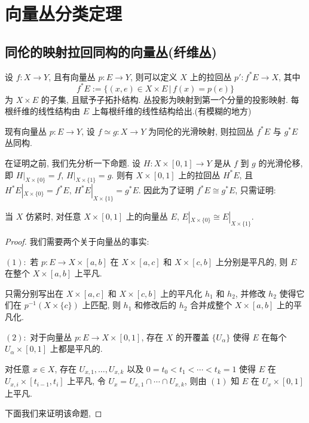     \section{向量丛分类定理}
    \subsection{同伦的映射拉回同构的向量丛(纤维丛)}
    \begin{definition}[拉回丛的定义]
        设 $f:X\rightarrow Y$, 且有向量丛 $p:E\rightarrow Y$, 则可以定义 $X$ 上的拉回丛 $p':f^*E\rightarrow X$, 其中 
        \begin{equation*}
            f^*E:=\{(x,e)\in X\times E\,\big|\,f(x)=p(e)\}
        \end{equation*}
        为 $X\times E$ 的子集, 且赋予子拓扑结构. 丛投影为映射到第一个分量的投影映射. 每根纤维的线性结构由 $E$ 上每根纤维的线性结构给出.(有模糊的地方)
    \end{definition}
    \begin{proposition}[同伦的映射拉回同构的向量丛]
        现有向量丛 $p:E\rightarrow Y$, 设 $f\simeq g:X\rightarrow Y$ 为同伦的光滑映射, 则拉回丛 $f^*E$ 与 $g^*E$ 丛同构.
    \end{proposition}

    在证明之前, 我们先分析一下命题. 设 $H:X\times[0,1]\rightarrow Y$ 是从 $f$ 到 $g$ 的光滑伦移, 即 $H|_{X\times\{0\}}=f$, $H|_{X\times\{1\}}=g$. 则有 $X\times[0,1]$ 上的拉回丛 $H^*E$, 
    且 $H^*E|_{X\times\{0\}}=f^*E,\,H^*E|_{X\times\{1\}}=g^*E$. 因此为了证明 $f^*E\cong g^*E$, 只需证明:

    \begin{proposition}[向量丛在柱空间的上下底的限制是同构的]
        当 $X$ 仿紧时, 对任意 $X\times[0,1]$ 上的向量丛 $E$, $E|_{X\times\{0\}}\cong E|_{X\times\{1\}}$.
    \end{proposition}
    \begin{proof}
        我们需要两个关于向量丛的事实:

        $(1):$ 若 $p:E\rightarrow X\times[a,b]$ 在 $X\times[a,c]$ 和 $X\times[c,b]$ 上分别是平凡的, 则 $E$ 在整个 $X\times[a,b]$ 上平凡. 
        
        只需分别写出在 $X\times[a,c]$ 和 $X\times[c,b]$ 
        上的平凡化 $h_1$ 和 $h_2$, 并修改 $h_2$ 使得它们在 $p^{-1}(X\times\{c\})$ 上匹配, 则 $h_1$ 和修改后的 $h_2$ 合并成整个 $X\times[a,b]$ 上的平凡化.

        $(2):$ 对于向量丛 $p:E\rightarrow X\times[0,1]$, 存在 $X$ 的开覆盖 $\{U_{\alpha}\}$ 使得 $E$ 在每个 $U_{\alpha}\times[0,1]$ 上都是平凡的. 
        
        对任意 $x\in X$, 存在 $U_{x,1},\dots,U_{x,k}$ 
        以及 $0=t_0<t_1<\cdots<t_k=1$ 使得 $E$ 在 $U_{x,i}\times[t_{i-1},t_i]$ 上平凡, 令 $U_x=U_{x,1}\cap\cdots\cap U_{x,k}$, 则由 $(1)$ 知 $E$ 在 $U_x\times[0,1]$ 上平凡.

        下面我们来证明该命题, 
    \end{proof}

